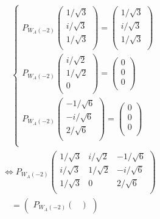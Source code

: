 \documentclass[dvipdfmx]{jsarticle}
\begin{document}
\begin{align*}
&\quad \left\{ \begin{matrix}
P_{W_{A}( - 2)}\begin{pmatrix}
{1}/{\sqrt{3}} \\
{i}/{\sqrt{3}} \\
{1}/{\sqrt{3}} \\
\end{pmatrix} = \begin{pmatrix}
{1}/{\sqrt{3}} \\
{i}/{\sqrt{3}} \\
{1}/{\sqrt{3}} \\
\end{pmatrix} \\
P_{W_{A}( - 2)}\begin{pmatrix}
{i}/{\sqrt{2}} \\
{1}/{\sqrt{2}} \\
0 \\
\end{pmatrix} = \begin{pmatrix}
0 \\
0 \\
0 \\
\end{pmatrix} \\
P_{W_{A}( - 2)}\begin{pmatrix}
 - {1}/{\sqrt{6}} \\
 - {i}/{\sqrt{6}} \\
{2}/{\sqrt{6}} \\
\end{pmatrix} = \begin{pmatrix}
0 \\
0 \\
0 \\
\end{pmatrix} \\
\end{matrix} \right.\ \\
&\Leftrightarrow P_{W_{A}( - 2)}\begin{pmatrix}
{1}/{\sqrt{3}} & {i}/{\sqrt{2}} & - {1}/{\sqrt{6}} \\
{i}/{\sqrt{3}} & {1}/{\sqrt{2}} & - {i}/{\sqrt{6}} \\
{1}/{\sqrt{3}} & 0 & {2}/{\sqrt{6}} \\
\end{pmatrix} \\
&\quad = \begin{pmatrix}
P_{W_{A}( - 2)}\begin{pmatrix}

\end{pmatrix}
\end{pmatrix}
\end{align*}
\end{document}
